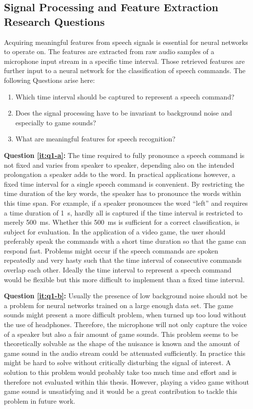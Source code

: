 \subsection{Signal Processing and Feature Extraction Research Questions}\label{sec:intro_rq_signal}
Acquiring meaningful features from speech signals is essential for neural networks to operate on. 
The features are extracted from raw audio samples of a microphone input stream in a specific time interval.
Those retrieved features are further input to a neural network for the classification of speech commands.
The following Questions arise here:
\begin{enumerate}[label={Q.1.\alph*)}, leftmargin=1.75cm]
  \item Which time interval should be captured to represent a speech command?\label{it:q1-a}
  \item Does the signal processing have to be invariant to background noise and especially to game sounds?\label{it:q1-b}
  \item What are meaningful features for speech recognition?\label{it:q1-c}
\end{enumerate}
\noindent
\textbf{Question \ref{it:q1-a}:} 
The time required to fully pronounce a speech command is not fixed and varies from speaker to speaker, depending also on the intended prolongation a speaker adds to the word.
In practical applications however, a fixed time interval for a single speech command is convenient.
By restricting the time duration of the key words, the speaker has to pronounce the words within this time span.
For example, if a speaker pronounces the word \enquote{left} and requires a time duration of \SI{1}{\second}, hardly all is captured if the time interval is restricted to merely \SI{500}{\milli\second}.
Whether this \SI{500}{\milli\second} is sufficient for a correct classification, is subject for evaluation.
In the application of a video game, the user should preferably speak the commands with a short time duration so that the game can respond fast.
Problems might occur if the speech commands are spoken repeatedly and very hasty such that the time interval of consecutive commands overlap each other.
Ideally the time interval to represent a speech command would be flexible but this more difficult to implement than a fixed time interval.

\textbf{Question \ref{it:q1-b}:}
Usually the presence of low background noise should not be a problem for neural networks trained on a large enough data set. 
The game sounds might present a more difficult problem, when turned up too loud without the use of headphones. 
Therefore, the microphone will not only capture the voice of a speaker but also a fair amount of game sounds. 
This problem seems to be theoretically solvable as the shape of the nuisance is known and the amount of game sound in the audio stream could be attenuated sufficiently.
In practice this might be hard to solve without critically disturbing the signal of interest.
A solution to this problem would probably take too much time and effort and is therefore not evaluated within this thesis. 
However, playing a video game without game sound is unsatisfying and it would be a great contribution to tackle this problem in future work.

